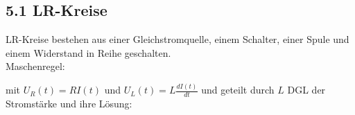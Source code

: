\subsection*{5.1 LR-Kreise}
    LR-Kreise bestehen aus einer Gleichstromquelle, einem Schalter, einer Spule und einem Widerstand in Reihe geschalten.\\
    Maschenregel:

    mit $U_R(t) = R I(t)$ und $U_L(t) = L \frac{dI(t)}{dt}$ und geteilt durch $L$
    DGL der Stromstärke und ihre Lösung:
